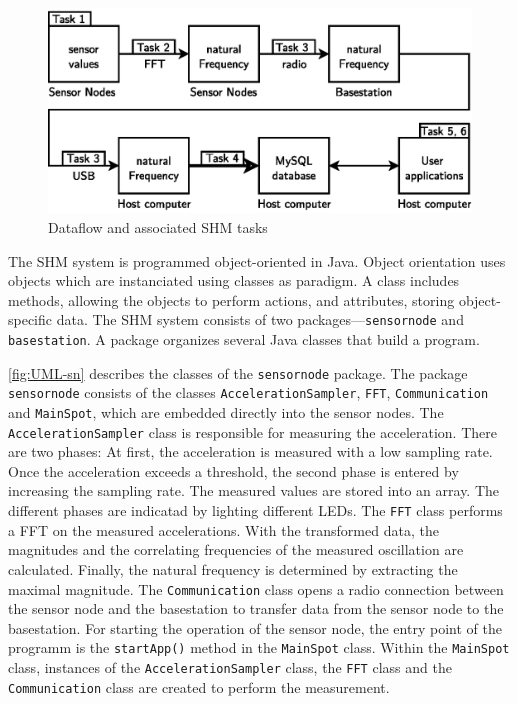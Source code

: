\documentclass[12pt,a4paper]{scrartcl}
\begin{document}
\begin{figure}[ht]
    \centering
    \includegraphics{figures/dataflow_tasks.eps}
    \caption{Dataflow and associated SHM tasks}
    \label{fig:flow}
\end{figure}

The SHM system is programmed object-oriented in Java. 
Object orientation uses objects which are instanciated using classes as paradigm. 
A class includes methods, allowing the objects to perform actions, and attributes, storing object-specific data.
The SHM system consists of two packages---\texttt{sensornode} and \texttt{basestation}.
A package organizes several Java classes that build a program.

\autoref{fig:UML-sn} describes the classes of the \texttt{sensor\-node} package.
The package \texttt{sensor\-node} consists of the classes \texttt{Acceleration\-Sampler}, \texttt{FFT}, \texttt{Communi\-cation} and \texttt{Main\-Spot}, which are embedded directly into the sensor nodes.
The \texttt{Acceleration\-Sampler} class is responsible for measuring the acceleration.
There are two phases: At first, the acceleration is measured with a low sampling rate.
Once the acceleration exceeds a threshold, the second phase is entered by increasing the sampling rate. 
The measured values are stored into an array.
The different phases are indicatad by lighting different LEDs.
The \texttt{FFT} class performs a FFT on the measured accelerations. 
With the transformed data, the magnitudes and the correlating frequencies of the measured oscillation are calculated.
Finally, the natural frequency is determined by extracting the maximal magnitude.
The \texttt{Communi\-cation} class opens a radio connection between the sensor node and the basestation to transfer data from the sensor node to the basestation.
For starting the operation of the sensor node, the entry point of the programm is the \texttt{start\-App()} method in the \texttt{Main\-Spot} class. 
Within the \texttt{Main\-Spot} class, instances of the \texttt{Acceleration\-Sampler} class, the \texttt{FFT} class and the \texttt{Communication} class are created to perform the measurement.
\end{document}
